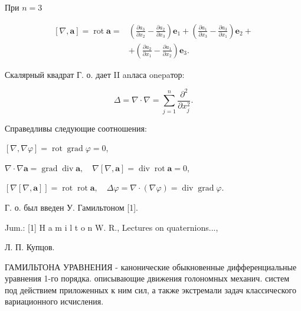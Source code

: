 \documentclass[10pt]{article}
\begin{document}
При $n=3$



\[

\begin{aligned}

{[\nabla, \boldsymbol{a}]=\operatorname{rot} \boldsymbol{a}=} & \left(\frac{\partial a_{3}}{\partial x_{2}}-\frac{\partial a_{2}}{\partial x_{3}}\right) \boldsymbol{e}_{1}+\left(\frac{\partial a_{1}}{\partial x_{3}}-\frac{\partial a_{3}}{\partial x_{1}}\right) \boldsymbol{e}_{2}+ \\

& +\left(\frac{\partial a_{2}}{\partial x_{1}}-\frac{\partial a_{1}}{\partial x_{2}}\right) \boldsymbol{e}_{3} .

\end{aligned}

\]



Скалярный квадрат $Г$. о. дает II anласа onepaтор:



\[

\Delta=\nabla \cdot \nabla=\sum_{j=1}^{n} \frac{\partial^{2}}{\partial x_{j}^{2}} .

\]



Справедливы следующие соотношения:



$[\nabla, \nabla \varphi]=\operatorname{rot} \operatorname{grad} \varphi=0$,



$\nabla \cdot \nabla \boldsymbol{a}=\operatorname{grad} \operatorname{div} \boldsymbol{a}, \quad \nabla[\nabla, \boldsymbol{a}]=\operatorname{div} \operatorname{rot} \boldsymbol{a}=0$,



$[\nabla[\nabla, \boldsymbol{a}]]=\operatorname{rot} \operatorname{rot} \boldsymbol{a}, \quad \Delta \varphi=\nabla \cdot(\nabla \varphi)=\operatorname{div} \operatorname{grad} \varphi$.



Г. о. был введен У. Гамильтоном [1].



Jum.: [1] H a m i l t o n W. R., Lectures on quaternions...,



Л. П. Купцов.



ГАМИЛЬТОНА УРАВНЕНИЯ - канонические обыкновенные дифференциальные уравнения 1-го порядка. описывающие движения голономных механич. систем под действием приложенных к ним сил, а также экстремали задач классического вариационного исчисления.
\end{document}

